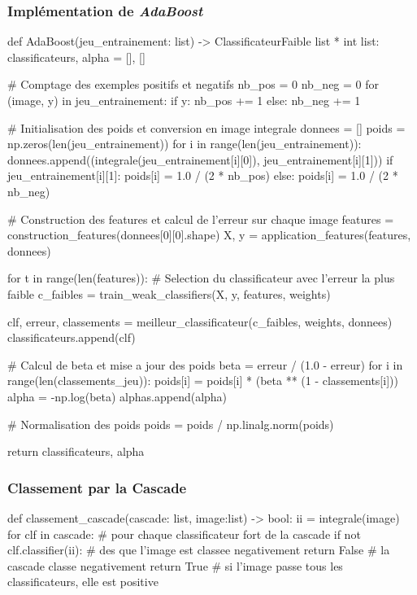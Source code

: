 \documentclass[12pt,a4paper]{article}
\begin{document}
\subsubsection{Implémentation de \textit{AdaBoost}} \label{sec:impl-adaboost}
\begin{python}
def AdaBoost(jeu_entrainement: list) -> ClassificateurFaible list * int list:    
    classificateurs, alpha = [], []

    # Comptage des exemples positifs et negatifs
    nb_pos = 0
    nb_neg = 0
    for (image, y) in jeu_entrainement:
        if y:
            nb_pos += 1
        else:
            nb_neg += 1
    
    # Initialisation des poids et conversion en image integrale
    donnees = []
    poids = np.zeros(len(jeu_entrainement))
    for i in range(len(jeu_entrainement)):
        donnees.append((integrale(jeu_entrainement[i][0]), jeu_entrainement[i][1]))
        if jeu_entrainement[i][1]:
            poids[i] = 1.0 / (2 * nb_pos)
        else:
            poids[i] = 1.0 / (2 * nb_neg)

    # Construction des features et calcul de l'erreur sur chaque image
    features = construction_features(donnees[0][0].shape)
    X, y = application_features(features, donnees)

    for t in range(len(features)):
        # Selection du classificateur avec l'erreur la plus faible
        c_faibles = train_weak_classifiers(X, y, features, weights)

        clf, erreur, classements = meilleur_classificateur(c_faibles, weights, donnees)
        classificateurs.append(clf)

        # Calcul de beta et mise a jour des poids
        beta = erreur / (1.0 - erreur)
        for i in range(len(classements_jeu)):
            poids[i] = poids[i] * (beta ** (1 - classements[i]))
        alpha = -np.log(beta)
        alphas.append(alpha)

        # Normalisation des poids
        poids = poids / np.linalg.norm(poids)

    return classificateurs, alpha
\end{python}

\newpage

\subsubsection{Classement par la Cascade} \label{sec:code-cascade}
\begin{python}
def classement_cascade(cascade: list, image:list) -> bool:
    ii = integrale(image)
    for clf in cascade: # pour chaque classificateur fort de la cascade
        if not clf.classifier(ii): # des que l'image est classee negativement
            return False # la cascade classe negativement
    return True # si l'image passe tous les classificateurs, elle est positive
\end{python}
\end{document}

